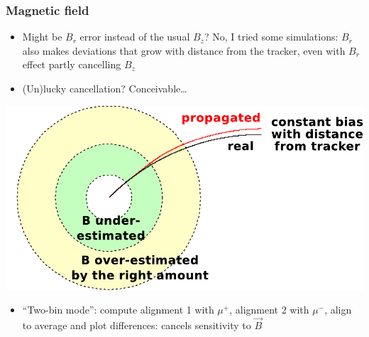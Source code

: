 \documentclass[compress]{beamer}
\begin{document}
\begin{frame}
\frametitle{Magnetic field}
\begin{itemize}
\item Might be $B_r$ error instead of the usual $B_z$?  No, I tried some simulations: $B_r$ also makes deviations that grow with distance from the tracker, even with $B_r$ effect partly cancelling $B_z$
\item (Un)lucky cancellation?  Conceivable\ldots
\end{itemize}

\begin{center}
\includegraphics[width=0.8\linewidth]{bfield_hypothesis.pdf}
\end{center}

\begin{itemize}
\item ``Two-bin mode'': compute alignment 1 with $\mu^+$, alignment 2
  with $\mu^-$, align to average and plot differences: cancels sensitivity to $\vec{B}$
 \end{itemize}
\end{frame}
\end{document}
